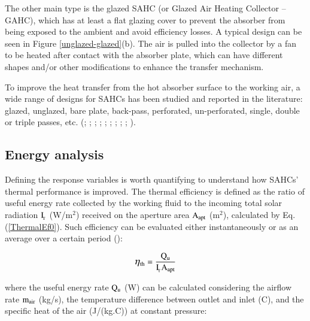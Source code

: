 The other main type is the glazed SAHC (or Glazed Air Heating Collector -- GAHC), which has at least a flat glazing cover to prevent the absorber from being exposed to the ambient and avoid efficiency losses. A typical design can be seen in Figure \ref{unglazed-glazed}(b). The air is pulled into the collector by a fan to be heated after contact with the absorber plate, which can have different shapes and/or other modifications to enhance the transfer mechanism.


To improve the heat transfer from the hot absorber surface to the working air, a wide range of designs for SAHCs has been studied and reported in the literature: glazed, unglazed, bare plate, back-pass, perforated, un-perforated, single, double or triple passes, etc. (\cite{Kutscher1994}; \cite{Christensen1997}; \cite{Gawlik2005}; \cite{Koyuncu2006}; \cite{Leon2007}; \cite{Tchinda2008}; \cite{El-Sebaii2010}; \cite{Athienitis2011}; \cite{Zheng2016}; \cite{Li2016}). %

\subsection{Energy analysis}

Defining the response variables is worth quantifying to understand how SAHCs' thermal performance is improved. The thermal efficiency is defined as the ratio of useful energy rate collected by the working fluid to the incoming total solar radiation $\rm{I_{\!_T}}$ (W/m$^{2}$) received on the aperture area $\rm{A_{apt}}$ (m$^{2}$), calculated by Eq. (\ref{ThermalEf0}). Such efficiency can be evaluated either instantaneously or as an average over a certain period (\cite{Goswami2015}):

\begin{equation}
	\mathrm{\mathlarger{\eta}_{\mathrm{th}} = \frac{Q_u}{I_{\!_T}A_{apt}}}
	\label{ThermalEf0}
\end{equation}

\noindent where the useful energy rate $\rm{Q_u}$ (W) can be calculated considering the airflow rate $\rm{m_{air}}$ (kg/s), the temperature difference between outlet and inlet (\textdegree C), and the specific heat of the air (J/(kg.\textdegree C)) at constant pressure:


